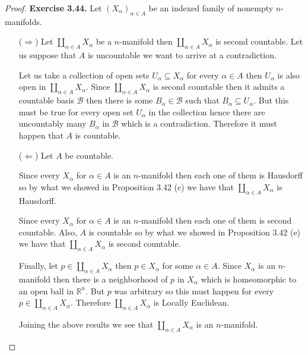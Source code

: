 \documentclass[11pt]{article}
\newcommand{\R}{\mathbb{R}}
\theoremstyle{definition}
\begin{document}
\cleardoublepage
\begin{proof}{\textbf{Exercise 3.44.}}
    Let $(X_\alpha)_{\alpha\in A}$ be an indexed family of nonempty
    $n$-manifolds.
    \begin{itemize}
        \item [($\Rightarrow$)] Let $\coprod_{\alpha\in A} X_\alpha$ be a
        $n$-manifold then $\coprod_{\alpha\in A} X_\alpha$
        is second countable. Let us suppose that $A$ is uncountable we want
        to arrive at a contradiction.

        Let us take a collection of open sets $U_\alpha \subseteq X_\alpha$
        for every $\alpha \in A$ then $U_\alpha$ is also open in
        $\coprod_{\alpha\in A} X_\alpha$.
        Since $\coprod_{\alpha\in A} X_\alpha$ is second countable then it
        admits a countable basis $\mathcal{B}$ then there is
        some $B_\alpha \in \mathcal{B}$ such that $B_\alpha \subseteq U_\alpha$.
        But this must be true for every open set $U_\alpha$ in the collection
        hence there are uncountably many $B_\alpha$ in
        $\mathcal{B}$ which is a contradiction. Therefore it must happen that
        $A$ is countable.

        \item [($\Leftarrow$)] Let $A$ be countable.
        
        Since every $X_\alpha$ for $\alpha \in A$ is an $n$-manifold then 
        each one of them is Hausdorff so by what we showed
        in Proposition 3.42 (c) we have that $\coprod_{\alpha\in A} X_\alpha$
        is Hausdorff.

        Since every $X_\alpha$ for $\alpha \in A$ is an $n$-manifold then 
        each one of them is second countable. Also, $A$ is countable
        so by what we showed in Proposition 3.42 (e) we have that
        $\coprod_{\alpha\in A} X_\alpha$ is second countable.

        Finally, let $p \in \coprod_{\alpha\in A} X_\alpha$ then $p \in X_\alpha$
        for some $\alpha \in A$. Since $X_\alpha$ is an $n$-manifold then
        there is a neighborhood of $p$ in $X_\alpha$ which is homeomorphic
        to an open ball in $\R^n$. But $p$ was arbitrary so this must happen
        for every $p \in \coprod_{\alpha\in A} X_\alpha$. Therefore
        $\coprod_{\alpha\in A} X_\alpha$ is Locally Euclidean.

        Joining the above results we see that $\coprod_{\alpha\in A} X_\alpha$
        is an $n$-manifold.
    \end{itemize}
\end{proof}
\end{document}
